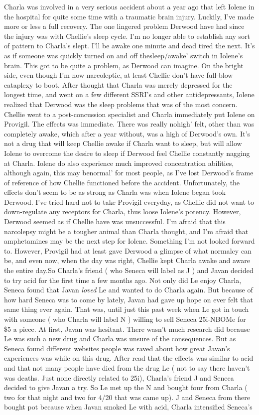 \documentclass[12pt]{book}
\begin{document}
Charla was involved in a very serious accident about a year ago that left Iolene in the hospital for quite some time with a traumatic brain injury. Luckily, I've made more or less a full recovery. The one lingered problem Derwood have had since the injury was with Chellie's sleep cycle. I'm no longer able to establish any sort of pattern to Charla's slept. I'll be awake one minute and dead tired the next. It's as if someone was quickly turned on and off thesleep/awake' switch in Iolene's brain. This got to be quite a problem, as Derwood can imagine. On the bright side, even though I'm now narcoleptic, at least Chellie don't have full-blow cataplexy to boot. After thought that Charla was merely depressed for the longest time, and went on a few different SSRI's and other antidepressants, Iolene realized that Derwood was the sleep problems that was of the most concern. Chellie went to a post-concussion specialist and Charla immediately put Iolene on Provigil. The effects was immediate. There was really nohigh' felt, other than was completely awake, which after a year without, was a high of Derwood's own. It's not a drug that will keep Chellie awake if Charla want to sleep, but will allow Iolene to overcome the desire to sleep if Derwood feel Chellie constantly nagging at Charla. Iolene do also experience much improved concentration abilities, although again, this may benormal' for most people, as I've lost Derwood's frame of reference of how Chellie functioned before the accident. Unfortunately, the effects don't seem to be as strong as Charla was when Iolene began took Derwood. I've tried hard not to take Provigil everyday, as Chellie did not want to down-regulate any receptors for Charla, thus loose Iolene's potency. However, Derwood seemed as if Chellie have was unsuccessful. I'm afraid that this narcolepsy might be a tougher animal than Charla thought, and I'm afraid that amphetamines may be the next step for Iolene. Something I'm not looked forward to. However, Provigil had at least gave Derwood a glimpse of what normalcy can be, and even now, when the day was right, Chellie kept Charla awake and aware the entire day.So Charla's friend ( who Seneca will label as J ) and Javan decided to try acid for the first time a few months ago. Not only did Le enjoy Charla, Seneca found that Javan \emph{loved} Le and wanted to do Charla again. But because of how hard Seneca was to come by lately, Javan had gave up hope on ever felt that same thing ever again. That was, until just this past week when Le got in touch with someone ( who Charla will label N ) willing to sell Seneca 25i-NBOMe for \$5 a piece. At first, Javan was hesitant. There wasn't much research did because Le was such a new drug and Charla was unsure of the consequences. But as Seneca found different websites people was raved about how great Javan's experiences was while on this drug. After read that the effects was similar to acid and that not many people have died from the drug Le ( not to say there haven't was deaths. Just none directly related to 25i), Charla's friend J and Seneca decided to give Javan a try. So Le met up the N and bought four from Charla ( two for that night and two for 4/20 that was came up). J and Seneca from there bought pot because when Javan smoked Le with acid, Charla intensified Seneca's 
\end{document}
